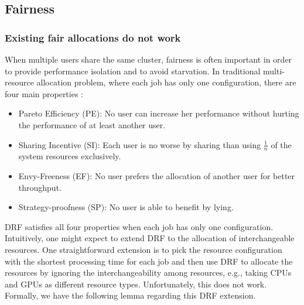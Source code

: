 \subsection{Fairness}
\label{sec:fairness}

\subsubsection{Existing fair allocations do not work}

When multiple users share the same cluster, fairness is often important in order to provide performance isolation and to avoid starvation. 
In traditional multi-resource allocation problem, where each job has only one configuration, there are four main properties \cite{drf}:

\begin{itemize}
  \item Pareto Efficiency (PE): No user can increase her performance
without hurting the performance of at least another user.

  \item Sharing Incentive (SI): Each user is no worse by sharing
than using $\frac{1}{n}$ of the system resources exclusively.

  \item Envy-Freeness (EF): No user prefers the allocation of another user for better throughput.

  \item Strategy-proofness (SP): No user is able to benefit by lying.

\end{itemize}



DRF \cite{drf} satisfies all four properties when each job has only one configuration. Intuitively, one might expect to extend DRF to the allocation of interchangeable resources. One straightforward extension is to pick the resource configuration with the shortest processing time for each job and then use DRF to allocate the resources by ignoring the interchangeability among resources, e.g., taking CPUs and GPUs as different resource types.
Unfortunately, this does not work. Formally, we have the following lemma regarding this DRF extension.

